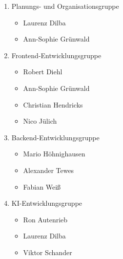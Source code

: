 \begin{enumerate}
\item Planungs- und Organisationsgruppe
\begin{itemize}
\item Laurenz Dilba
\item Ann-Sophie Grünwald
\end{itemize}
\item Frontend-Entwicklungsgruppe
\begin{itemize}
\item Robert Diehl
\item Ann-Sophie Grünwald
\item Christian Hendricks
\item Nico Jülich
\end{itemize}
\item Backend-Entwicklungsgruppe
\begin{itemize}
\item Mario Höhnighausen
\item Alexander Tewes
\item Fabian Weiß
\end{itemize}
\item KI-Entwicklungsgruppe
\begin{itemize}
\item Ron Autenrieb
\item Laurenz Dilba
\item Viktor Schander
\end{itemize}
\end{enumerate}
